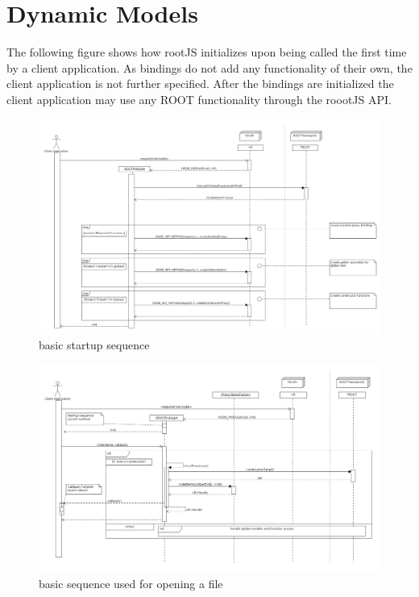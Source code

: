 \pagebreak[4]

\section{Dynamic Models}
The following figure shows how rootJS initializes upon being called the first time by a client application. As bindings do not add any functionality of their own, the client application is not further specified. After the bindings are initialized the client application may use any ROOT functionality through the roootJS API.

\begin{figure}[htb]
	\centering
	\includegraphics[width=18cm]{./latex/resources/startupSequence.png}
	\caption{basic startup sequence}
\end{figure}

\begin{figure}[htb]
	\centering
	\includegraphics[width=18cm]{./latex/resources/fileOpen.png}
	\caption{basic sequence used for opening a file}
\end{figure}

